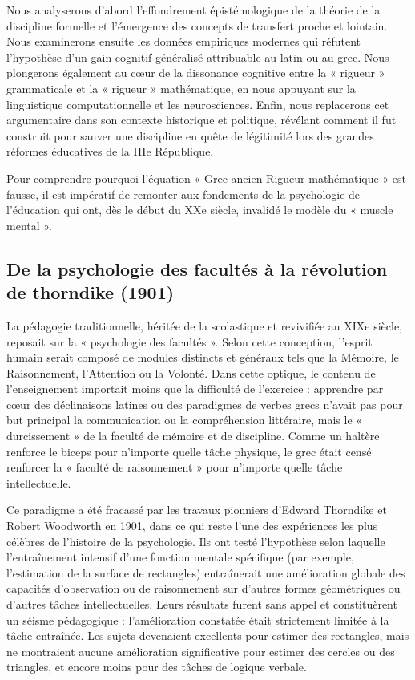 Nous analyserons d'abord l'effondrement épistémologique de la théorie de la discipline formelle et
l'émergence des concepts de transfert proche et lointain. Nous examinerons ensuite les données
empiriques modernes qui réfutent l'hypothèse d'un gain cognitif généralisé attribuable au latin ou
au grec. Nous plongerons également au cœur de la dissonance cognitive entre la « rigueur »
grammaticale et la « rigueur » mathématique, en nous appuyant sur la linguistique computationnelle
et les neurosciences. Enfin, nous replacerons cet argumentaire dans son contexte historique et
politique, révélant comment il fut construit pour sauver une discipline en quête de légitimité lors
des grandes réformes éducatives de la IIIe République.\cite{II-1-2-ref11}

Pour comprendre pourquoi l'équation « Grec ancien \= Rigueur mathématique » est fausse, il est
impératif de remonter aux fondements de la psychologie de l'éducation qui ont, dès le début du XXe
siècle, invalidé le modèle du « muscle mental ».



\subsection{De la psychologie des facultés à la révolution de thorndike (1901)}

La pédagogie traditionnelle, héritée de la scolastique et revivifiée au XIXe siècle, reposait sur la
« psychologie des facultés ». Selon cette conception, l'esprit humain serait composé de modules
distincts et généraux tels que la Mémoire, le Raisonnement, l'Attention ou la
Volonté.\cite{II-1-2-ref5} Dans cette optique, le contenu de l'enseignement importait moins que la
difficulté de l'exercice : apprendre par cœur des déclinaisons latines ou des paradigmes de verbes
grecs n'avait pas pour but principal la communication ou la compréhension littéraire, mais le «
durcissement » de la faculté de mémoire et de discipline. Comme un haltère renforce le biceps pour
n'importe quelle tâche physique, le grec était censé renforcer la « faculté de raisonnement » pour
n'importe quelle tâche intellectuelle.\cite{II-1-2-ref1}

Ce paradigme a été fracassé par les travaux pionniers d'Edward Thorndike et Robert Woodworth en
1901, dans ce qui reste l'une des expériences les plus célèbres de l'histoire de la psychologie. Ils
ont testé l'hypothèse selon laquelle l'entraînement intensif d'une fonction mentale spécifique (par
exemple, l'estimation de la surface de rectangles) entraînerait une amélioration globale des
capacités d'observation ou de raisonnement sur d'autres formes géométriques ou d'autres tâches
intellectuelles.\cite{II-1-2-ref6} Leurs résultats furent sans appel et constituèrent un séisme
pédagogique : l'amélioration constatée était strictement limitée à la tâche entraînée. Les sujets
devenaient excellents pour estimer des rectangles, mais ne montraient aucune amélioration
significative pour estimer des cercles ou des triangles, et encore moins pour des tâches de logique
verbale.\cite{II-1-2-ref14}

